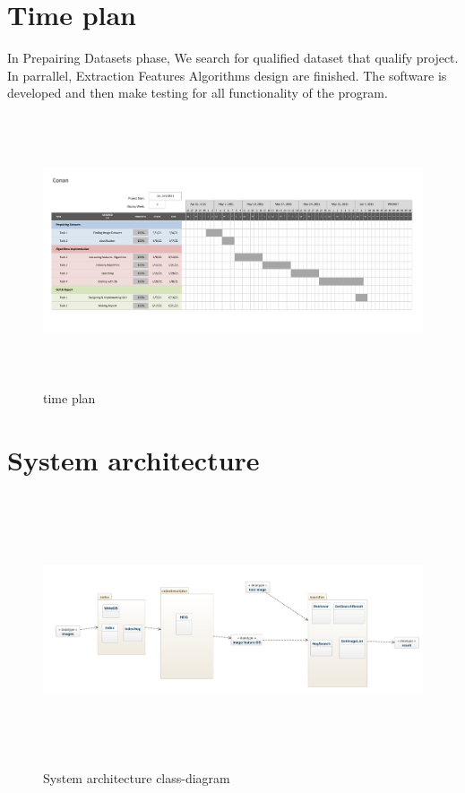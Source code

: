 \documentclass[pdftex,10pt,a4paper,oneside]{article}
\begin{document}
		
	\pagebreak
	\section{Time plan}
In Prepairing Datasets phase, We search for qualified dataset that qualify project.
In parrallel, Extraction Features Algorithms design are finished. The software is
developed and then make testing for all functionality of the
program.

	
	\begin{figure}[H]
		\centering
		\includegraphics[width=140mm,height=80mm]{fig/5.png}
		\caption{time plan }
		\label{time plan}
	\end{figure}
	\pagebreak
	\section{System architecture}
		\begin{figure}[H]
		\centering
		\includegraphics[width=140mm,height=80mm]{fig/22.png}
		\caption{System architecture class-diagram }
		\label{System architecture class-diagram}
	\end{figure}
\end{document}
